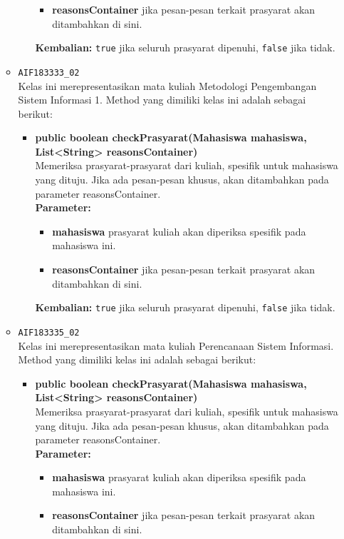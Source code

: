 \begin{enumerate}
\begin{itemize}
\begin{itemize}
\begin{itemize}
				\item \textbf{reasonsContainer} jika pesan-pesan terkait prasyarat akan ditambahkan di sini.
			\end{itemize}
			\textbf{Kembalian:} \texttt{true} jika seluruh prasyarat dipenuhi, \texttt{false} jika tidak.
		\end{itemize}
		\item \texttt{AIF183333\_02} \\
		Kelas ini merepresentasikan mata kuliah Metodologi Pengembangan Sistem Informasi 1. Method yang dimiliki kelas ini adalah sebagai berikut: 
		\begin{itemize}
			\item \textbf{public boolean checkPrasyarat(Mahasiswa mahasiswa, List<String> reasonsContainer)}\\
			Memeriksa prasyarat-prasyarat dari kuliah, spesifik untuk mahasiswa yang dituju. Jika ada pesan-pesan khusus, akan ditambahkan pada parameter reasonsContainer.\\
			\textbf{Parameter:}
			\begin{itemize}
				\item \textbf{mahasiswa} prasyarat kuliah akan diperiksa spesifik pada mahasiswa ini.
				\item \textbf{reasonsContainer} jika pesan-pesan terkait prasyarat akan ditambahkan di sini.
			\end{itemize}
			\textbf{Kembalian:} \texttt{true} jika seluruh prasyarat dipenuhi, \texttt{false} jika tidak.
		\end{itemize}
		\item \texttt{AIF183335\_02} \\
		Kelas ini merepresentasikan mata kuliah Perencanaan Sistem Informasi. Method yang dimiliki kelas ini adalah sebagai berikut: 
		\begin{itemize}
			\item \textbf{public boolean checkPrasyarat(Mahasiswa mahasiswa, List<String> reasonsContainer)}\\
			Memeriksa prasyarat-prasyarat dari kuliah, spesifik untuk mahasiswa yang dituju. Jika ada pesan-pesan khusus, akan ditambahkan pada parameter reasonsContainer.\\
			\textbf{Parameter:}
			\begin{itemize}
				\item \textbf{mahasiswa} prasyarat kuliah akan diperiksa spesifik pada mahasiswa ini.
				\item \textbf{reasonsContainer} jika pesan-pesan terkait prasyarat akan ditambahkan di sini.

\end{itemize}
\end{itemize}
\end{itemize}
\end{enumerate}

